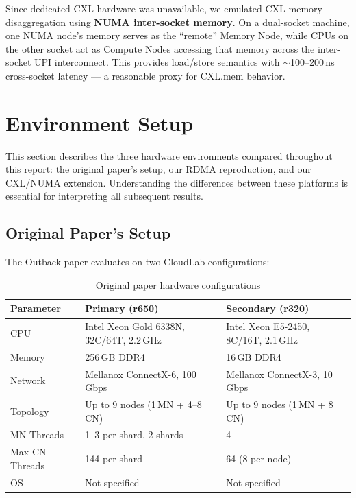 \documentclass[conference]{IEEEtran}
\begin{document}
Since dedicated CXL hardware was unavailable, we emulated CXL memory disaggregation using \textbf{NUMA inter-socket memory}. On a dual-socket machine, one NUMA node's memory serves as the ``remote'' Memory Node, while CPUs on the other socket act as Compute Nodes accessing that memory across the inter-socket UPI interconnect. This provides load/store semantics with $\sim$100--200\,ns cross-socket latency --- a reasonable proxy for CXL.mem behavior.

\section{Environment Setup}

This section describes the three hardware environments compared throughout this report: the original paper's setup, our RDMA reproduction, and our CXL/NUMA extension. Understanding the differences between these platforms is essential for interpreting all subsequent results.

\subsection{Original Paper's Setup}

The Outback paper evaluates on two CloudLab configurations:

\begin{table}[H]
\centering
\caption{Original paper hardware configurations}
\label{tab:paper-setup}
\small
\begin{tabular}{@{}lll@{}}
\toprule
\textbf{Parameter} & \textbf{Primary (r650)} & \textbf{Secondary (r320)} \\
\midrule
CPU        & Intel Xeon Gold 6338N, 32C/64T, 2.2\,GHz & Intel Xeon E5-2450, 8C/16T, 2.1\,GHz \\
Memory     & 256\,GB DDR4                              & 16\,GB DDR4 \\
Network    & Mellanox ConnectX-6, 100\,Gbps             & Mellanox ConnectX-3, 10\,Gbps \\
Topology   & Up to 9 nodes (1\,MN + 4--8\,CN)          & Up to 9 nodes (1\,MN + 8\,CN) \\
MN Threads & 1--3 per shard, 2 shards                  & 4 \\
Max CN Threads & 144 per shard                          & 64 (8 per node) \\
OS         & Not specified                              & Not specified \\
\bottomrule
\end{tabular}
\end{table}
\end{document}

